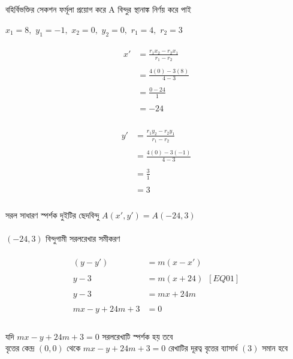 \documentclass{article}
\begin{document}
	\\ 
	বহির্বিভক্তির সেকশন ফর্মূলা প্রয়োগ করে A বিন্দুর স্থানাঙ্ক নির্ণয় করে পাই \\
	\\ 
	$x_1=8,\,\,y_1=-1,\,\,x_2=0,\,\,y_2=0,\,\,r_1=4,\,\,r_2=3$\\
	\\
	\begin{align*}
		x'&=\frac{r_1x_2-r_2x_1}{r_1-r_2}\\
		\\
		&=\frac{4(0)-3(8)}{4-3}\\
		\\
		&=\frac{0-24}{1}\\
		\\
		&=-24\\
	\end{align*}
	\\
	\begin{align*}
		y'&=\frac{r_1y_2-r_2y_1}{r_1-r_2}\\
		\\
		&=\frac{4(0)-3(-1)}{4-3}\\
		\\
		&=\frac{3}{1}\\
		\\
		&=3\\
	\end{align*}
	\\
	সরল সাধারণ স্পর্শক দুইটির ছেদবিন্দু $A(x',y')=A(-24,3)$\\
	\\
	$(-24,3)$ বিন্দুগামী সরলরেখার  সমীকরণ \\
	\\ 
	\begin{align*}
		(y-y')&=m(x-x')\\
		\\
		y-3&=m(x+24)\,\,\,[EQ01]\\
		\\
		y-3&=mx+24m\\
		\\
		mx-y+24m+3&=0\\
	\end{align*}
	\\
	যদি $mx-y+24m+3=0$ সরলরেখাটি স্পর্শক হয় তবে \\
	বৃত্তের কেন্দ্র $(0,0)$ থেকে $mx-y+24m+3=0$ রেখাটির  দূরত্ব  বৃত্তের ব্যাসার্ধ $(3)$ সমান হবে \\
	\\  
\end{document}
